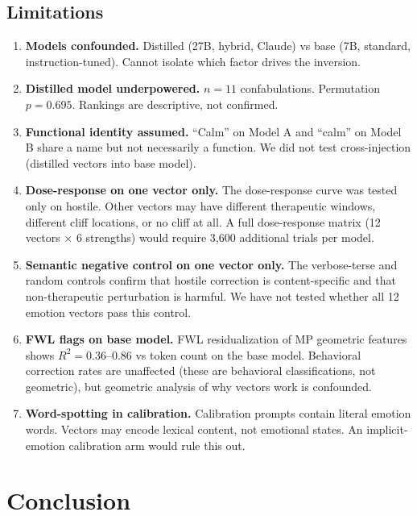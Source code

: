 \documentclass[11pt,a4paper]{article}
\begin{document}
\subsection{Limitations}

\begin{enumerate}
\item \textbf{Models confounded.} Distilled (27B, hybrid, Claude) vs
base (7B, standard, instruction-tuned). Cannot isolate which factor
drives the inversion.
\item \textbf{Distilled model underpowered.} $n = 11$ confabulations.
Permutation $p = 0.695$. Rankings are descriptive, not confirmed.
\item \textbf{Functional identity assumed.} ``Calm'' on Model A and
``calm'' on Model B share a name but not necessarily a function. We
did not test cross-injection (distilled vectors into base model).
\item \textbf{Dose-response on one vector only.} The dose-response
curve was tested only on hostile. Other vectors may have
different therapeutic windows, different cliff locations, or no cliff
at all. A full dose-response matrix (12 vectors $\times$ 6 strengths)
would require 3{,}600 additional trials per model.
\item \textbf{Semantic negative control on one vector only.} The
verbose-terse and random controls confirm that hostile
correction is content-specific and that non-therapeutic perturbation is
harmful. We have not tested whether all 12 emotion vectors pass this
control.
\item \textbf{FWL flags on base model.} FWL residualization \citep{frisch1933partial,lovell1963seasonal} of MP geometric features shows
$R^2 = 0.36$--$0.86$ vs token count on the base model. Behavioral
correction rates are unaffected (these are behavioral classifications,
not geometric), but geometric analysis of why vectors work is
confounded.
\item \textbf{Word-spotting in calibration.} Calibration prompts
contain literal emotion words. Vectors may encode lexical content,
not emotional states. An implicit-emotion calibration arm would rule
this out.
\end{enumerate}

\section{Conclusion}
\end{document}
